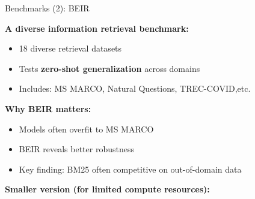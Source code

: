 \documentclass[11pt,compress,t,notes=noshow, xcolor=table]{beamer}
\begin{document}

\begin{frame}{Benchmarks (2): BEIR}

\vfill

\textbf{A diverse information retrieval benchmark:} 

\begin{itemize}
    \item 18 diverse retrieval datasets
    \item Tests \textbf{zero-shot generalization} across domains
    \item Includes: MS MARCO, Natural Questions, TREC-COVID,etc.
\end{itemize}

\vspace{1em}

\textbf{Why BEIR matters:}
\begin{itemize}
    \item Models often overfit to MS MARCO
    \item BEIR reveals better robustness
    \item Key finding: BM25 often competitive on out-of-domain data
\end{itemize}

\vspace{1em}

\textbf{Smaller version (for limited compute resources):} 

\vfill

\end{frame}

\end{document}
